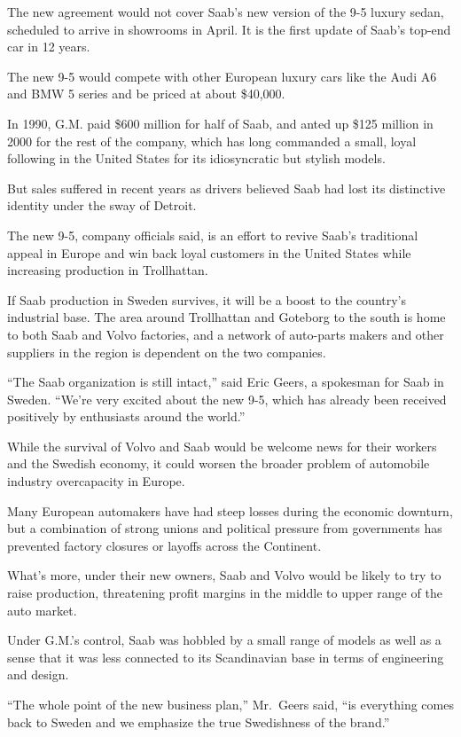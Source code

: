 ﻿\documentclass[12pt]{article}
\begin{document}
The new agreement would not cover Saab's new version of the 9-5 luxury sedan, scheduled to arrive in
showrooms in April. It is the first update of Saab's top-end car in 12 years.

The new 9-5 would compete with other European luxury cars like the Audi A6 and BMW 5 series and be
priced at about \$40,000.

In 1990, G.M. paid \$600 million for half of Saab, and anted up \$125 million in 2000 for the rest
of the company, which has long commanded a small, loyal following in the United States for its
idiosyncratic but stylish models.

But sales suffered in recent years as drivers believed Saab had lost its distinctive identity under
the sway of Detroit.

The new 9-5, company officials said, is an effort to revive Saab's traditional appeal in Europe and
win back loyal customers in the United States while increasing production in Trollhattan.

If Saab production in Sweden survives, it will be a boost to the country's industrial base. The area
around Trollhattan and Goteborg to the south is home to both Saab and Volvo factories, and a network
of auto-parts makers and other suppliers in the region is dependent on the two companies.

``The Saab organization is still intact,'' said Eric Geers, a spokesman for Saab in Sweden. ``We're
very excited about the new 9-5, which has already been received positively by enthusiasts around the
world.''

While the survival of Volvo and Saab would be welcome news for their workers and the Swedish
economy, it could worsen the broader problem of automobile industry overcapacity in Europe.

Many European automakers have had steep losses during the economic downturn, but a combination of
strong unions and political pressure from governments has prevented factory closures or layoffs
across the Continent.

What's more, under their new owners, Saab and Volvo would be likely to try to raise production,
threatening profit margins in the middle to upper range of the auto market.

Under G.M.'s control, Saab was hobbled by a small range of models as well as a sense that it was
less connected to its Scandinavian base in terms of engineering and design.

``The whole point of the new business plan,'' Mr.~Geers said, ``is everything comes back to Sweden
and we emphasize the true Swedishness of the brand.''
\end{document}
